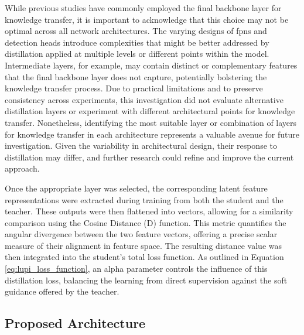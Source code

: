While previous studies have commonly employed the final backbone layer for knowledge transfer, it is important to acknowledge that this choice may not be optimal across all network architectures. The varying designs of \glspl{fpn} and detection heads introduce complexities that might be better addressed by distillation applied at multiple levels or different points within the model. Intermediate layers, for example, may contain distinct or complementary features that the final backbone layer does not capture, potentially bolstering the knowledge transfer process. Due to practical limitations and to preserve consistency across experiments, this investigation did not evaluate alternative distillation layers or experiment with different architectural points for knowledge transfer. Nonetheless, identifying the most suitable layer or combination of layers for knowledge transfer in each architecture represents a valuable avenue for future investigation. Given the variability in architectural design, their response to distillation may differ, and further research could refine and improve the current approach.

Once the appropriate layer was selected, the corresponding latent feature representations were extracted during training from both the student and the teacher. These outputs were then flattened into vectors, allowing for a similarity comparison using the Cosine Distance (\gls{D}) function. This metric quantifies the angular divergence between the two feature vectors, offering a precise scalar measure of their alignment in feature space. The resulting distance value was then integrated into the student’s total loss function. As outlined in Equation \ref{eq:lupi_loss_function}, an \gls{alpha} parameter controls the influence of this distillation loss, balancing the learning from direct supervision against the soft guidance offered by the teacher.

\subsection{Proposed Architecture}
\label{subsec:4_architecture}

